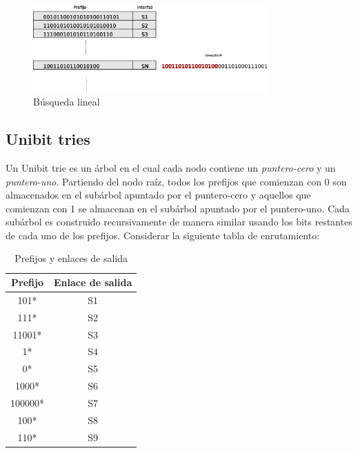\begin{figure}[h]
  \centering
	\includegraphics[width=0.80\textwidth]{2-sistema/graf/linear.eps}
  \caption{Búsqueda lineal}
  \label{fig:linear}
\end{figure}

\newpage
\subsection {Unibit tries}

Un Unibit trie es un árbol en el cual cada nodo contiene un \textit{puntero-cero }y un \textit{puntero-uno}. Partiendo del nodo raíz, todos los prefijos que comienzan con 0 son almacenados en el subárbol apuntado por el puntero-cero y aquellos que comienzan con 1 se almacenan en el subárbol apuntado por el puntero-uno. Cada subárbol es construido recursivamente de manera similar usando los bits restantes de cada uno de los prefijos.
Considerar la siguiente tabla de enrutamiento:
\begin{table}[h]
\begin{center}
	\begin{tabular}{|c|c|} \hline
		\textbf{Prefijo} & \textbf{Enlace de salida} \\ \hline
		101* & S1 \\
		111* & S2 \\
		11001* & S3 \\
		1* & S4 \\
		0* & S5 \\
		1000* & S6 \\
		100000* & S7 \\
		100* & S8 \\
		110* & S9 \\	\hline
	\end{tabular}
	\caption{Prefijos y enlaces de salida}
	\label{tab:prefgw}	
\end{center}
\end{table}



